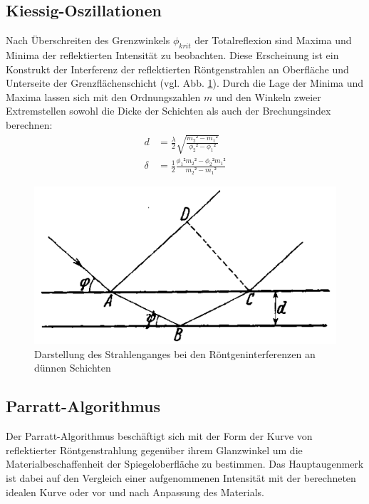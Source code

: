 \subsection{Kiessig-Oszillationen}
Nach Überschreiten des Grenzwinkels $\phi_{krit}$ der Totalreflexion sind Maxima und Minima der reflektierten Intensität zu beobachten.
Diese Erscheinung ist ein Konstrukt der Interferenz der reflektierten Röntgenstrahlen an Oberfläche und Unterseite der Grenzflächenschicht (vgl. Abb. \ref{fig:kiessig}).
Durch die Lage der Minima und Maxima lassen sich mit den Ordnungszahlen $m$ und den Winkeln zweier Extremstellen sowohl die Dicke der Schichten als auch der Brechungsindex berechnen: \cite{kiessig}
\begin{align}
    d &= \frac{\lambda}{2}\sqrt{\frac{m_2²-m_1²}{\phi_2²-\phi_1²}} \\
    \delta &= \frac{1}{2}\frac{\phi_1² m_2² - \phi_2² m_1²}{m_2²-m_1²}
\end{align}

\begin{figure}
    \center
    \includegraphics[width=0.6\linewidth]{abb/kiessig.png}
    \caption{Darstellung des Strahlenganges bei den Röntgeninterferenzen an dünnen Schichten \cite{kiessig}}
    \label{fig:kiessig}
\end{figure}

\subsection{Parratt-Algorithmus}
Der Parratt-Algorithmus beschäftigt sich mit der Form der Kurve von reflektierter Röntgenstrahlung gegenüber ihrem Glanzwinkel um die Materialbeschaffenheit der Spiegeloberfläche zu bestimmen.
Das Hauptaugenmerk ist dabei auf den Vergleich einer aufgenommenen Intensität mit der berechneten idealen Kurve oder vor und nach Anpassung des Materials.

